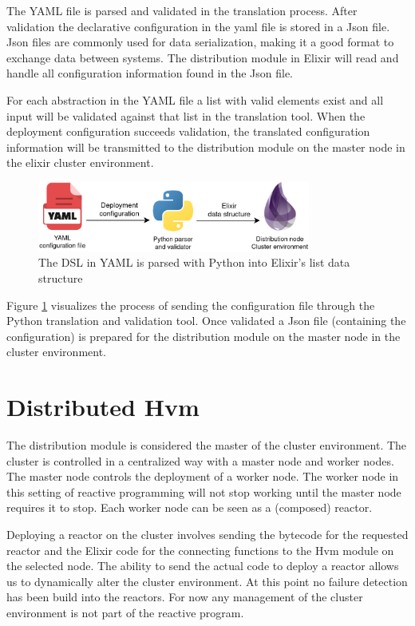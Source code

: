 \documentclass[a4paper]{book}
\begin{document}
The YAML file is parsed and validated in the translation process. After validation the declarative configuration in the yaml file is stored in a Json file. Json files are commonly used for data serialization, making it a good format to exchange data between systems. The distribution module in Elixir will read and handle all configuration information found in the Json file.

 For each abstraction in the YAML file a list with valid elements exist and all input will be validated against that list in the translation tool. When the deployment configuration succeeds validation, the translated configuration information will be transmitted to the distribution module on the master node in the elixir cluster environment. 

\begin{figure}[h]
	\centering
	\includegraphics[width=0.8\textwidth]{yaml.drawio}
	\caption{The DSL in YAML is parsed with Python into Elixir's list data structure}
	\label{fig:yaml}
\end{figure}  

Figure \ref{fig:yaml} visualizes the process of sending the configuration file through the Python translation and validation tool. Once validated a Json file (containing the configuration) is prepared for the distribution module on the master node in the cluster environment.


\section{Distributed Hvm}
The distribution module is considered the master of the cluster environment. The cluster is controlled in a centralized way with a master node and worker nodes. The master node controls the deployment of a worker node. The worker node in this setting of reactive programming will not stop working until the master node requires it to stop. Each worker node can be seen as a (composed) reactor.  

Deploying a reactor on the cluster involves sending the bytecode for the requested reactor and the Elixir code for the connecting functions to the Hvm module on the selected node. The ability to send the actual code to deploy a reactor allows us to dynamically alter the cluster environment. At this point no failure detection has been build into the reactors. For now any management of the cluster environment is not part of the reactive program.  
\end{document}
